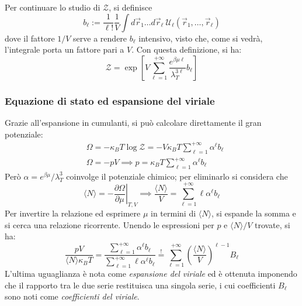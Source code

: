 \documentclass[11pt, a4paper]{scrartcl}
\theoremstyle{style}
\theoremstyle{style1}
\newcommand*\Eval[3]{\left.#1\right\rvert_{#2}^{#3}}
\numberwithin{equation}{subsection}
\begin{document}
\noindent Per continuare lo studio di $\mathcal{Z} $, si definisce 
\[
b_\ell := \frac{1}{\ell !}\frac{1}{V} \int d\vec{r}_1 \ldots d\vec{r}_\ell\ \mathcal{U} _\ell (\vec{r}_1,\ldots,\vec{r}_\ell )
\] 
dove il fattore $1 / V$ serve a rendere $b_\ell $ intensivo, visto che, come si vedr\`a, l'integrale porta un fattore pari a $V$.
Con questa definizione, si ha:
\[
\mathcal{Z}  = \exp \left[ V \sum_{\ell =1}^{+\infty} \frac{e^{\beta \mu \ell }}{\lambda _T^{3\ell }}b_\ell  \right] 
\] 
\subsubsection{Equazione di stato ed espansione del viriale}
Grazie all'espansione in cumulanti, si pu\`o calcolare direttamente il gran potenziale:
\[
	\begin{split}
		&\Omega = - \kappa _B T \log \mathcal{Z}  = - V \kappa _B T \sum_{\ell =1}^{+\infty} \alpha ^\ell b_\ell \\
		&\Omega = - pV \implies p = \kappa _B T \sum_{\ell =1}^{+\infty} \alpha ^\ell b_\ell  
	\end{split}
\] 
Per\`o $\alpha  = e^{\beta \mu }/ \lambda _T^3$ coinvolge il potenziale chimico; per eliminarlo si considera che
\[
	\langle N \rangle= \Eval{- \frac{\partial \Omega }{\partial \mu } }{T,V}{} \implies \frac{\langle N \rangle}{V} =\sum_{\ell =1}^{+\infty} \ell \alpha ^\ell b_\ell 
\] 
Per invertire la relazione ed esprimere $\mu $ in termini di $\langle N \rangle$, si espande la somma e si cerca una relazione ricorrente.
Unendo le espressioni per $p$ e $\langle N \rangle/V$ trovate, si ha:
\[
\frac{pV}{\langle N \rangle\kappa _B T} = \frac{\sum_{\ell =1}^{+\infty} \alpha ^\ell b_\ell }{\sum_{\ell =1}^{+\infty } \ell \alpha ^\ell b_\ell } \stackrel{!}{=} \sum_{\ell =1}^{+\infty} \left(\frac{\langle N \rangle}{V}\right) ^{\ell -1}  B_\ell  
\] 
L'ultima uguaglianza \`e nota come \textit{espansione del viriale} ed \`e ottenuta imponendo che il rapporto tra le due serie restituisca una singola serie, i cui coefficienti $B_\ell $ sono noti come \textit{coefficienti del viriale}.
\end{document}

